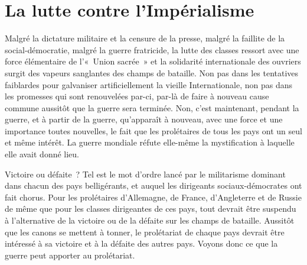 \documentclass[french,twoside]{book} %
\begin{document}
\section[{La lutte contre l’Impérialisme}]{La lutte contre l’Impérialisme}\renewcommand{\leftmark}{La lutte contre l’Impérialisme}

\noindent   Malgré la dictature militaire et la censure de la presse, malgré la faillite de la social-démocratie, malgré la guerre fratricide, la lutte des classes ressort avec une force élémentaire de l’« Union sacrée » et la solidarité internationale des ouvriers surgit des vapeurs sanglantes des champs de bataille. Non pas dans les tentatives faiblardes pour galvaniser artificiellement la vieille Internationale, non pas dans les promesses qui sont renouvelées par-ci, par-là de faire à nouveau cause commune aussitôt que la guerre sera terminée. Non, c’est maintenant, pendant la guerre, et à partir de la guerre, qu’apparaît à nouveau, avec une force et une importance toutes nouvelles, le fait que les prolétaires de tous les pays ont un seul et même intérêt. La guerre mondiale réfute elle-même la mystification à laquelle elle avait donné lieu.\par
Victoire ou défaite ? Tel est le mot d’ordre lancé par le militarisme dominant dans chacun des pays belligérants, et auquel les dirigeants sociaux-démocrates ont fait chorus. Pour les prolétaires d’Allemagne, de France, d’Angleterre et de Russie de même que pour les classes dirigeantes de ces pays, tout devrait être suspendu à l’alternative de la victoire ou de la défaite sur les champs de bataille. Aussitôt que les canons se mettent à tonner, le prolétariat de chaque pays devrait être intéressé à sa victoire et à la défaite des autres pays. Voyons donc ce que la guerre peut apporter au prolétariat.\par
\end{document}
